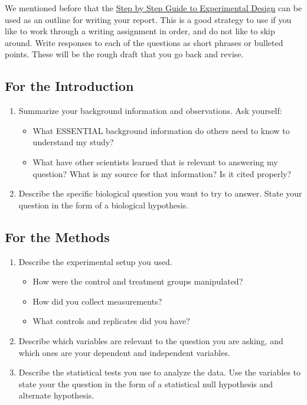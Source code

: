 \documentclass[
]{book}
\providecommand{\tightlist}{%
  \setlength{\itemsep}{0pt}\setlength{\parskip}{0pt}}
\begin{document}
We mentioned before that the \protect\hyperlink{expdesign210}{Step by Step Guide to Experimental Design} can be used as an outline for writing your report. This is a good strategy to use if you like to work through a writing assignment in order, and do not like to skip around. Write responses to each of the questions as short phrases or bulleted points. These will be the rough draft that you go back and revise.

\hypertarget{for-the-introduction}{%
\subsection*{For the Introduction}\label{for-the-introduction}}

\begin{enumerate}
\def\labelenumi{\arabic{enumi}.}
\tightlist
\item
  Summarize your background information and observations. Ask yourself:

  \begin{itemize}
  \tightlist
  \item
    What ESSENTIAL background information do others need to know to understand my study?
  \item
    What have other scientists learned that is relevant to answering my question? What is my source for that information? Is it cited properly?
  \end{itemize}
\item
  Describe the specific biological question you want to try to answer. State your question in the form of a biological hypothesis.
\end{enumerate}

\hypertarget{for-the-methods}{%
\subsection*{For the Methods}\label{for-the-methods}}

\begin{enumerate}
\def\labelenumi{\arabic{enumi}.}
\setcounter{enumi}{2}
\item
  Describe the experimental setup you used.

  \begin{itemize}
  \tightlist
  \item
    How were the control and treatment groups manipulated?
  \item
    How did you collect measurements?
  \item
    What controls and replicates did you have?
  \end{itemize}
\item
  Describe which variables are relevant to the question you are asking, and which ones are your dependent and independent variables.
\item
  Describe the statistical tests you use to analyze the data. Use the variables to state your the question in the form of a statistical null hypothesis and alternate hypothesis.
\end{enumerate}
\end{document}
